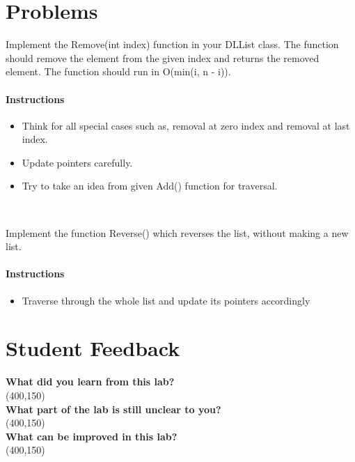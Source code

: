 \documentclass[11pt,fleqn]{book} %
\begin{document}
\section{Problems}
\begin{problem}
	Implement the Remove(int index) function in your DLList class. The function should remove the element from the given index and returns the removed element. The function should run in O(min(i, n - i)).
	\paragraph{Instructions}
	\begin{itemize}
		\item Think for all special cases such as, removal at zero index and removal at last index.
		\item Update pointers carefully.
		\item Try to take an idea from given Add() function for traversal.
	\end{itemize}
\end{problem}
~\\
\begin{problem}
	Implement the function Reverse() which reverses the list, without making a new list.
	\paragraph{Instructions}
	\begin{itemize}
		\item Traverse through the whole list and update its pointers accordingly
	\end{itemize}
\end{problem}

 \newpage
 \section{Student Feedback}
 \textbf{What did you learn from this lab?}\\ 
 \framebox(400,150){}\\
 \textbf{What part of the lab is still unclear to you?}\\
 \framebox(400,150){}\\
 \textbf{What can be improved in this lab?}\\ 
 \framebox(400,150){}\\
 
 \newpage
 
\end{document}
